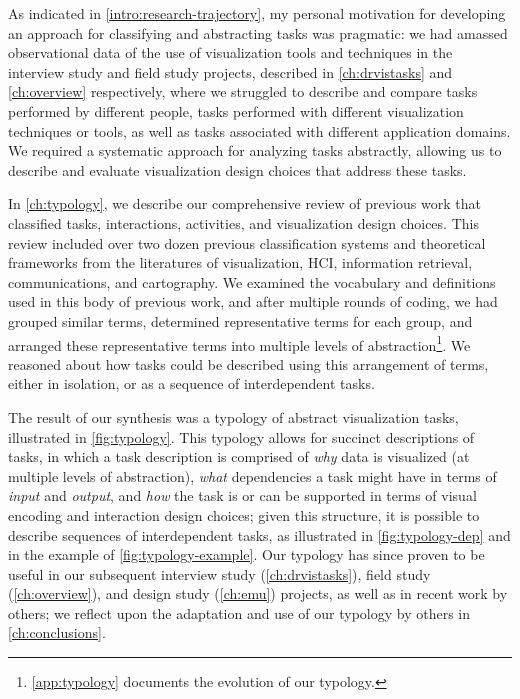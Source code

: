 As indicated in \autoref{intro:research-trajectory}, my personal motivation for developing an approach for classifying and abstracting tasks was pragmatic: we had amassed observational data of the use of visualization tools and techniques in the interview study and field study projects, described in \autoref{ch:drvistasks} and \autoref{ch:overview} respectively, where we struggled to describe and compare tasks performed by different people, tasks performed with different visualization techniques or tools, as well as tasks associated with different application domains.
We required a systematic approach for analyzing tasks abstractly, allowing us to describe and evaluate visualization design choices that address these tasks.

In \autoref{ch:typology}, we describe our comprehensive review of previous work that classified tasks, interactions, activities, and visualization design choices.
This review included over two dozen previous classification systems and theoretical frameworks from the literatures of visualization, \ac{HCI}, information retrieval, communications, and cartography. 
We examined the vocabulary and definitions used in this body of previous work, and after multiple rounds of coding, we had grouped similar terms, determined representative terms for each group, and arranged these representative terms into multiple levels of abstraction\footnote{\autoref{app:typology} documents the evolution of our typology.}.
We reasoned about how tasks could be described using this arrangement of terms, either in isolation, or as a sequence of interdependent tasks.

The result of our synthesis was a typology of abstract visualization tasks, illustrated in \autoref{fig:typology}.
This typology allows for succinct descriptions of tasks, in which a task description is comprised of {\it why} data is visualized (at multiple levels of abstraction), {\it what} dependencies a task might have in terms of {\it input} and {\it output}, and {\it how} the task is or can be supported in terms of visual encoding and interaction design choices; given this structure, it is possible to describe sequences of interdependent tasks, as illustrated in \autoref{fig:typology-dep} and in the example of \autoref{fig:typology-example}.
Our typology has since proven to be useful in our subsequent interview study (\autoref{ch:drvistasks}), field study (\autoref{ch:overview}), and design study (\autoref{ch:emu}) projects, as well as in recent work by others; we reflect upon the adaptation and use of our typology by others in \autoref{ch:conclusions}.

